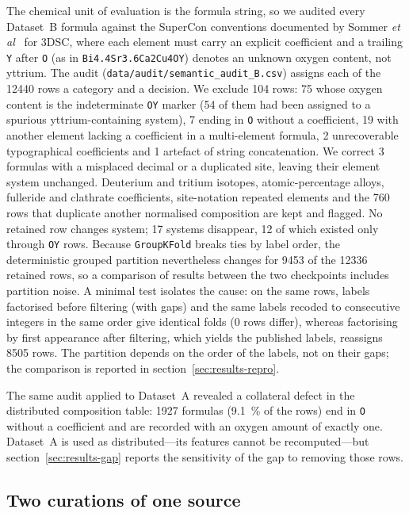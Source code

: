 \documentclass{iopjournal}
\newcommand{\etal}{\textit{et al}}
\begin{document}
The chemical unit of evaluation is the formula string, so we audited every Dataset~B formula
against the SuperCon conventions documented by Sommer \etal~\cite{sommer2023} for 3DSC, where each
element must carry an explicit coefficient and a trailing \texttt{Y} after \texttt{O} (as in
\texttt{Bi4.4Sr3.6Ca2Cu4OY}) denotes an unknown oxygen content, not yttrium. The audit
(\texttt{data/audit/semantic\_audit\_B.csv}) assigns each of the \num{12440} rows a category and a
decision. We exclude \num{104} rows: \num{75} whose oxygen content is the indeterminate \texttt{OY}
marker (\num{54} of them had been assigned to a spurious yttrium-containing system), \num{7} ending
in \texttt{O} without a coefficient, \num{19} with another element lacking a coefficient in a
multi-element formula, \num{2} unrecoverable typographical coefficients and \num{1} artefact of
string concatenation. We correct \num{3} formulas with a misplaced decimal or a duplicated site,
leaving their element system unchanged. Deuterium and tritium isotopes, atomic-percentage alloys,
fulleride and clathrate coefficients, site-notation repeated elements and the \num{760} rows that
duplicate another normalised composition are kept and flagged. No retained row changes system;
\num{17} systems disappear, \num{12} of which existed only through \texttt{OY} rows. Because
\texttt{GroupKFold} breaks ties by label order, the deterministic grouped partition nevertheless
changes for \num{9453} of the \num{12336} retained rows, so a comparison of results between the two checkpoints includes partition noise. A minimal test isolates the cause: on the same rows, labels factorised before filtering (with gaps) and the same labels recoded to consecutive integers in the same order give identical folds (\num{0} rows differ), whereas factorising by first appearance after filtering, which yields the published labels, reassigns \num{8505} rows. The partition depends on the order of the labels, not on their gaps; the comparison is reported in
section~\ref{sec:results-repro}.

The same audit applied to Dataset~A revealed a collateral defect in the distributed composition
table: \num{1927} formulas (\SI{9.1}{\percent} of the rows) end in \texttt{O} without a coefficient
and are recorded with an oxygen amount of exactly one. Dataset~A is used as distributed---its
features cannot be recomputed---but section~\ref{sec:results-gap} reports the sensitivity of the
gap to removing those rows.

\subsection{Two curations of one source}
\label{sec:overlap}
\end{document}
